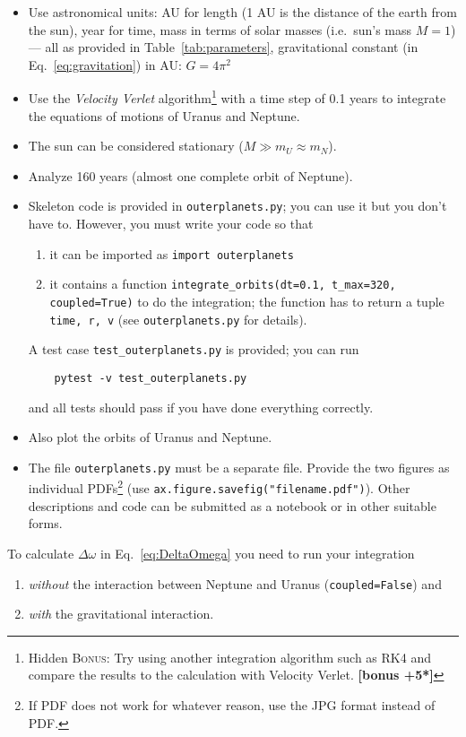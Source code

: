 \documentclass[letterpaper]{scrartcl}
\newcounter{TotalBonus}
\newcommand{\BONUS}{\textsc{Bonus: }}
\newcommand{\bonus}[1]{\textbf{[bonus +#1*]}\stepcounter{TotalBonus}}
\begin{document}
\begin{itemize}
\item Use astronomical units: AU for length (1 AU is the distance of
  the earth from the sun), year for time, mass in terms of solar
  masses (i.e.\ sun's mass $M = 1$) --- all as provided in
  Table~\ref{tab:parameters}, gravitational constant (in
  Eq.~\ref{eq:gravitation}) in AU: $G = 4\pi^{2}$
\item Use the \emph{Velocity Verlet} algorithm\footnote{Hidden \BONUS
    Try using another integration algorithm such as RK4 and compare
    the results to the calculation with Velocity Verlet. \bonus{5}}
  with a time step of 0.1 years to integrate the equations of motions
  of Uranus and Neptune.
\item The sun can be considered stationary ($M \gg m_U \approx m_N$).
\item Analyze 160 years (almost one complete orbit of Neptune).
\item Skeleton code is provided in \texttt{outerplanets.py}; you can
  use it but you don't have to. However, you must write your code so
  that
  \begin{enumerate}
  \item it can be imported as \texttt{import outerplanets}
  \item it contains a function \texttt{integrate\_orbits(dt=0.1,
      t\_max=320, coupled=True)} to do the integration; the function
    has to return a tuple \texttt{time, r, v} (see
    \texttt{outerplanets.py} for details).
  \end{enumerate}
  A test case \texttt{test\_outerplanets.py} is provided; you can run
  \begin{verbatim}
    pytest -v test_outerplanets.py
  \end{verbatim}
  and all tests should pass if you have done everything correctly.
\item Also plot the orbits of Uranus and Neptune.
\item The file \texttt{outerplanets.py} must be a separate file.
  Provide the two figures as individual PDFs\footnote{If PDF does not
    work for whatever reason, use the JPG format instead of PDF.} (use
  \texttt{ax.figure.savefig("filename.pdf")}). Other descriptions and
  code can be submitted as a notebook or in other suitable forms.
\end{itemize}

To calculate $\Delta\omega$ in Eq.~\ref{eq:DeltaOmega} you need to run
your integration 
\begin{enumerate}
\item \emph{without} the interaction between Neptune and Uranus
  (\texttt{coupled=False}) and 
\item \emph{with} the gravitational interaction.
\end{enumerate}
\end{document}
